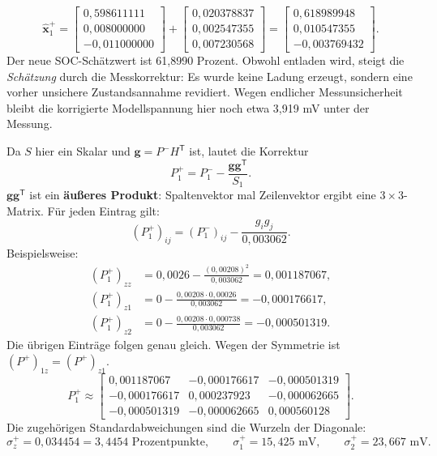 \[
\hat{\mathbf x}_1^+
=\begin{bmatrix}0{,}598611111\\0{,}008000000\\-0{,}011000000\end{bmatrix}
+\begin{bmatrix}0{,}020378837\\0{,}002547355\\0{,}007230568\end{bmatrix}
=\boxed{\begin{bmatrix}0{,}618989948\\0{,}010547355\\-0{,}003769432\end{bmatrix}.}
\]
Der neue SOC-Schätzwert ist 61,8990 Prozent. Obwohl entladen wird, steigt die \emph{Schätzung} durch die Messkorrektur: Es wurde keine Ladung erzeugt, sondern eine vorher unsichere Zustandsannahme revidiert. Wegen endlicher Messunsicherheit bleibt die korrigierte Modellspannung hier noch etwa 3,919 mV unter der Messung.

Da $S$ hier ein Skalar und $\mathbf g=P^-H^{\mathsf T}$ ist, lautet die Korrektur
\[
\boxed{P_1^+=P_1^- -\frac{\mathbf g\mathbf g^{\mathsf T}}{S_1}.}
\]
$\mathbf g\mathbf g^{\mathsf T}$ ist ein \textbf{äußeres Produkt}: Spaltenvektor mal Zeilenvektor ergibt eine $3\times3$-Matrix. Für jeden Eintrag gilt:
\[
(P_1^+)_{ij}=(P_1^-)_{ij}-\frac{g_ig_j}{0{,}003062}.
\]
Beispielsweise:
\[
\begin{aligned}
(P_1^+)_{zz}&=0{,}0026-\frac{(0{,}00208)^2}{0{,}003062}=0{,}001187067,\\
(P_1^+)_{z1}&=0-\frac{0{,}00208\cdot0{,}00026}{0{,}003062}=-0{,}000176617,\\
(P_1^+)_{z2}&=0-\frac{0{,}00208\cdot0{,}000738}{0{,}003062}=-0{,}000501319.
\end{aligned}
\]
Die übrigen Einträge folgen genau gleich. Wegen der Symmetrie ist $(P^+)_{1z}=(P^+)_{z1}$.
\[
\boxed{P_1^+\approx
\begin{bmatrix}
0{,}001187067&-0{,}000176617&-0{,}000501319\\
-0{,}000176617&0{,}000237923&-0{,}000062665\\
-0{,}000501319&-0{,}000062665&0{,}000560128
\end{bmatrix}.}
\]
Die zugehörigen Standardabweichungen sind die Wurzeln der Diagonale:
\[
\sigma_z^+=0{,}034454=3{,}4454\text{ Prozentpunkte},\qquad
\sigma_1^+=15{,}425\text{ mV},\qquad \sigma_2^+=23{,}667\text{ mV}.
\]

